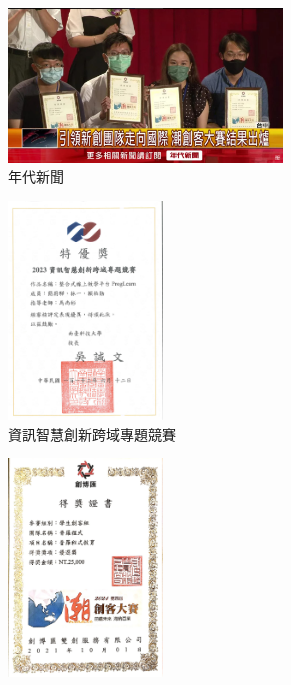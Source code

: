 \begin{figure}[H]
  \centering
  \begin{subfigure}{0.32\linewidth}
    \centering
    \includegraphics[width=0.8\textwidth]{images/年代新聞.jpg}
    \caption{年代新聞}
    \label{fig:News}
  \end{subfigure}
    \begin{subfigure}{0.31\linewidth}
    \centering
    \includegraphics[width=0.45\textwidth]{images/ProgLearn.jpg}
    \caption{資訊智慧創新跨域專題競賽}
    \label{fig:Awards-1}
  \end{subfigure}
  \begin{subfigure}{0.31\linewidth}
    \centering
    \includegraphics[width=0.45\textwidth]{images/創博匯.jpg}

\end{subfigure}
\end{figure}
